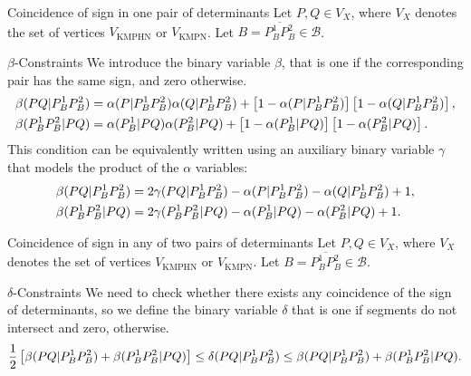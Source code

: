 \documentclass[slidestop,usepdftitle=false,10pt]{beamer}
\newcommand{\VKMPHN}{{V_{\text{KMPHN}}}}
\newcommand{\VKMPN}{{V_{\text{KMPN}}}}
\begin{document}
	\begin{frame}{Coincidence of sign in one pair of determinants}
		\footnotesize
		Let $P,Q\in V_X$, where $V_X$ denotes the set of vertices $\VKMPHN$ or $\VKMPN$. Let $B=\overline{P_B^1P_B^2}\in\mathcal B$.
		\begin{block}{$\beta$-Constraints}
			We introduce the binary variable $\beta$, that is one if the corresponding pair has the same sign, and zero otherwise.
			\begin{align*}%
				\betamas{P}{Q}{P_B^1}{P_B^2}&=\alphamas{P}{P_B^1}{P_B^2}\alphamas{Q}{P_B^1}{P_B^2} + \left[1-\alphamas{P}{P_B^1}{P_B^2}\right]\left[1-\alphamas{Q}{P_B^1}{P_B^2}\right],\\
				\betamas{P_B^1}{P_B^2}{P}{Q}&=\alphamas{P_B^1}{P}{Q}\alphamas{P_B^2}{P}{Q} + \left[1-\alphamas{P_B^1}{P}{Q}\right]\left[1-\alphamas{P_B^2}{P}{Q}\right].
			\end{align*}
				This condition can be equivalently written using an auxiliary binary variable $\gamma$ that models the product of the $\alpha$ variables:
			\begin{align*}%
				\betamas{P}{Q}{P_B^1}{P_B^2}&=2\gammaprod{P}{Q}{P_B^1}{P_B^2}-\alphamas{P}{P_B^1}{P_B^2}-\alphamas{Q}{P_B^1}{P_B^2}+1,\\
				\betamas{P_B^1}{P_B^2}{P}{Q}&=2\gammaprod{P_B^1}{P_B^2}{P}{Q} -\alphamas{P_B^1}{P}{Q}-\alphamas{P_B^2}{P}{Q}+1.
			\end{align*}
		\end{block}
	\end{frame}

	\newcommand{\deltacheck}[4]{\delta(#1#2|#3#4)}
	\begin{frame}{Coincidence of sign in any of two pairs of determinants}
		\footnotesize
		Let $P,Q\in V_X$, where $V_X$ denotes the set of vertices $\VKMPHN$ or $\VKMPN$. Let $B=\overline{P_B^1P_B^2}\in\mathcal B$.
		\begin{block}{$\delta$-Constraints}
			We need to check whether there exists any coincidence of the sign of determinants, so we define the binary variable $\delta$ that is one if segments do not intersect and zero, otherwise.
			\begin{equation*}\label{eq:deltaC}
			\frac{1}{2}\left[\betamas{P}{Q}{P_B^1}{P_B^2}+\betamas{P_B^1}{P_B^2}{P}{Q}\right]\leq\deltacheck{P}{Q}{P_B^1}{P_B^2}\leq \betamas{P}{Q}{P_B^1}{P_B^2}+\betamas{P_B^1}{P_B^2}{P}{Q}.
			\end{equation*}
		\end{block}
	\end{frame}
	
\end{document}
